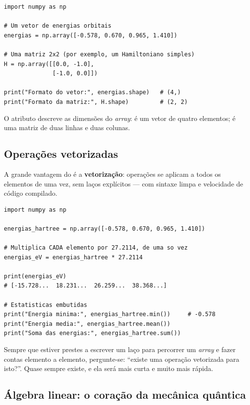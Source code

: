 \begin{lstlisting}[style=python,caption={Criando arrays com \numpy{}.},label={lst:nparray}]
import numpy as np

# Um vetor de energias orbitais
energias = np.array([-0.578, 0.670, 0.965, 1.410])

# Uma matriz 2x2 (por exemplo, um Hamiltoniano simples)
H = np.array([[0.0, -1.0],
              [-1.0, 0.0]])

print("Formato do vetor:", energias.shape)   # (4,)
print("Formato da matriz:", H.shape)         # (2, 2)
\end{lstlisting}

\noindent
O atributo  descreve as dimensões do \emph{array}:  é um vetor
de quatro elementos;  é uma matriz de duas linhas e duas colunas.

\subsection{Operações vetorizadas}

A grande vantagem do \numpy{} é a \textbf{vetorização}: operações se aplicam a todos
os elementos de uma vez, sem laços explícitos --- com sintaxe limpa e velocidade
de código compilado.

\begin{lstlisting}[style=python,caption={Vetorização: convertendo um vetor inteiro de unidades.}]
import numpy as np

energias_hartree = np.array([-0.578, 0.670, 0.965, 1.410])

# Multiplica CADA elemento por 27.2114, de uma so vez
energias_eV = energias_hartree * 27.2114

print(energias_eV)
# [-15.728...  18.231...  26.259...  38.368...]

# Estatisticas embutidas
print("Energia minima:", energias_hartree.min())     # -0.578
print("Energia media:", energias_hartree.mean())
print("Soma das energias:", energias_hartree.sum())
\end{lstlisting}

\begin{caixadica}
Sempre que estiver prestes a escrever um laço para percorrer um \emph{array} e
fazer contas elemento a elemento, pergunte-se: ``existe uma operação \numpy{}
vetorizada para isto?''. Quase sempre existe, e ela será mais curta e muito mais
rápida.
\end{caixadica}

\subsection{Álgebra linear: o coração da mecânica quântica}

